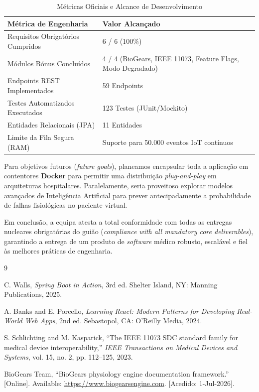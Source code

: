 \documentclass[11pt,a4paper]{article}
\begin{document}
\begin{table}[H]
\centering
\caption{Métricas Oficiais e Alcance de Desenvolvimento}
\label{tab:project_metrics}
\renewcommand{\arraystretch}{1.2}
\begin{tabular}{ll}
\rowcolor{primaryblue} \textbf{\color{white}Métrica de Engenharia} & \textbf{\color{white}Valor Alcançado} \\
\midrule
Requisitos Obrigatórios Cumpridos & 6 / 6 (100\%) \\
\rowcolor{softgray} Módulos Bónus Concluídos & 4 / 4 (BioGears, IEEE 11073, Feature Flags, Modo Degradado) \\
Endpoints REST Implementados & 59 Endpoints \\
\rowcolor{softgray} Testes Automatizados Executados & 123 Testes (JUnit/Mockito) \\
Entidades Relacionais (JPA) & 11 Entidades \\
\rowcolor{softgray} Limite da Fila Segura (RAM) & Suporte para 50.000 eventos IoT contínuos \\
\bottomrule
\end{tabular}
\end{table}

Para objetivos futuros (\textit{future goals}), planeamos encapsular toda a aplicação em contentores \textbf{Docker} para permitir uma distribuição \textit{plug-and-play} em arquiteturas hospitalares. Paralelamente, seria proveitoso explorar modelos avançados de Inteligência Artificial para prever antecipadamente a probabilidade de falhas fisiológicas no paciente virtual.

Em conclusão, a equipa atesta a total conformidade com todas as entregas nucleares obrigatórias do guião (\textit{compliance with all mandatory core deliverables}), garantindo a entrega de um produto de \textit{software} médico robusto, escalável e fiel às melhores práticas de engenharia. 

\begin{thebibliography}{9}

C. Walls, \textit{Spring Boot in Action}, 3rd ed. Shelter Island, NY: Manning Publications, 2025.

A. Banks and E. Porcello, \textit{Learning React: Modern Patterns for Developing Real-World Web Apps}, 2nd ed. Sebastopol, CA: O'Reilly Media, 2024.

S. Schlichting and M. Kasparick, ``The IEEE 11073 SDC standard family for medical device interoperability,'' \textit{IEEE Transactions on Medical Devices and Systems}, vol. 15, no. 2, pp. 112--125, 2023.

BioGears Team, ``BioGears physiology engine documentation framework.'' [Online]. Available: \url{https://www.biogearsengine.com}. [Acedido: 1-Jul-2026].

\end{thebibliography}
\end{document}
